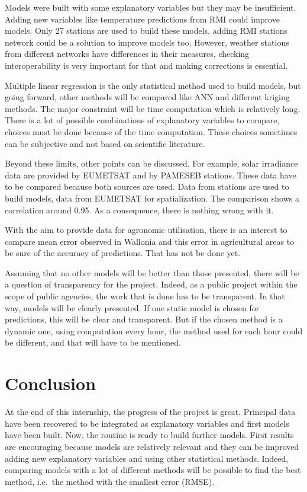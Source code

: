 \documentclass[12pt,twoside]{reedthesis}
\theoremstyle{definition}
\theoremstyle{definition}
\theoremstyle{definition}
\theoremstyle{remark}
\begin{document}
Models were built with some explanatory variables but they may be
insufficient. Adding new variables like temperature predictions from RMI
could improve models. Only 27 stations are used to build these models,
adding RMI stations network could be a solution to improve models too.
However, weather stations from different networks have differences in
their measures, checking interoperability is very important for that and
making corrections is essential.

Multiple linear regression is the only statistical method used to build
models, but going forward, other methods will be compared like ANN and
different kriging methods. The major constraint will be time computation
which is relatively long. There is a lot of possible combinations of
explanatory variables to compare, choices must be done because of the
time computation. These choices sometimes can be subjective and not
based on scientific literature.

Beyond these limits, other points can be discussed. For example, solar
irradiance data are provided by EUMETSAT and by PAMESEB stations. These
data have to be compared because both sources are used. Data from
stations are used to build models, data from EUMETSAT for
spatialization. The comparison shows a correlation around 0.95. As a
consequence, there is nothing wrong with it.

With the aim to provide data for agronomic utilisation, there is an
interest to compare mean error observed in Wallonia and this error in
agricultural areas to be sure of the accuracy of predictions. That has
not be done yet.

Assuming that no other models will be better than those presented, there
will be a question of transparency for the project. Indeed, as a public
project within the scope of public agencies, the work that is done has
to be transparent. In that way, models will be clearly presented. If one
static model is chosen for predictions, this will be clear and
transparent. But if the chosen method is a dynamic one, using
computation every hour, the method used for each hour could be
different, and that will have to be mentioned.

\chapter*{Conclusion}\label{conclusion}

At the end of this internship, the progress of the project is great.
Principal data have been recovered to be integrated as explanatory
variables and first models have been built. Now, the routine is ready to
build further models. First results are encouraging because models are
relatively relevant and they can be improved adding new explanatory
variables and using other statistical methods. Indeed, comparing models
with a lot of different methods will be possible to find the best
method, i.e.~the method with the smallest error (RMSE).
\end{document}
